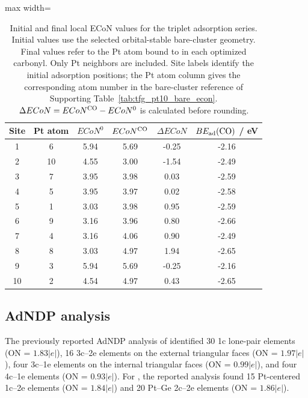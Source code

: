 \begin{table}[htbp]
\centering
\caption{Initial and final local ECoN values for the triplet
 adsorption series. Initial values use the selected
orbital-stable bare-cluster geometry. Final values refer to the Pt atom
bound to  in each optimized carbonyl. Only Pt neighbors are included.
Site labels identify the initial adsorption positions; the Pt atom column
gives the corresponding atom number in the bare-cluster reference of
Supporting Table~\ref{tab:tfg_pt10_bare_econ}.
$\Delta ECoN=ECoN^{\ce{CO}}-ECoN^{0}$ is calculated before rounding.}
\label{tab:tfg_pt10_der_econ_co}
\small
\begin{adjustbox}{max width=\linewidth}
\begin{tabular}{cccccc}
\toprule
{Site} & {Pt atom} & {$ECoN^{0}$} & {$ECoN^{\ce{CO}}$} &
{$\Delta ECoN$} & {$BE_{\rm ad}(\ce{CO})$ / eV} \\
\midrule
1  & 6  & 5.94 & 5.69 & -0.25 & -2.16 \\
2  & 10 & 4.55 & 3.00 & -1.54 & -2.49 \\
3  & 7  & 3.95 & 3.98 & 0.03 & -2.59 \\
4  & 5  & 3.95 & 3.97 & 0.02 & -2.58 \\
5  & 1  & 3.03 & 3.98 & 0.95 & -2.59 \\
6  & 9  & 3.16 & 3.96 & 0.80 & -2.66 \\
7  & 4  & 3.16 & 4.06 & 0.90 & -2.49 \\
8  & 8  & 3.03 & 4.97 & 1.94 & -2.65 \\
9  & 3  & 5.94 & 5.69 & -0.25 & -2.16 \\
10 & 2  & 4.54 & 4.97 & 0.43 & -2.65 \\
\bottomrule
\end{tabular}
\end{adjustbox}
\end{table}

\clearpage
\subsection*{AdNDP analysis}

The previously reported AdNDP analysis of  identified 30
1c lone-pair elements (ON = $1.83|e|$), 16 3c--2e elements on the external
triangular faces (ON = $1.97|e|$), four 3c--1e elements on the internal
triangular faces (ON = $0.99|e|$), and four 4c--1e elements (ON =
$0.93|e|$). For , the reported analysis found 15 Pt-centered
1c--2e elements (ON = $1.84|e|$) and 20 Pt--Ge 2c--2e elements (ON =
$1.86|e|$)\cite{ugartemendia:2022}.

